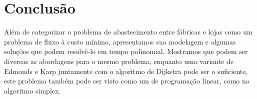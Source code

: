 \documentclass[12pt, a4]{article}
\begin{document}
\section{Conclusão}
\label{sec:conclusion}

Além de categorizar o problema de abastecimento entre fábricas e lojas como um
problema de fluxo à custo mínimo, apresentamos sua modelagem e algumas soluções
que podem resolvê-lo em tempo polinomial. Mostramos que podem ser diversas as
abordagens para o mesmo problema, enquanto uma variante de Edmonds e Karp
juntamente com o algoritmo de Dijkstra pode ser o suficiente, este problema
também pode ser visto como um de programação linear, como no algoritmo simplex.
\end{document}
